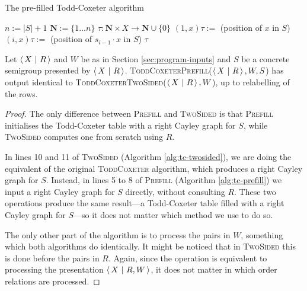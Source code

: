 \begin{algorithm}
\caption{The pre-filled Todd-Coxeter algorithm}
\label{alg:tc-prefill}
\begin{algorithmic}[1]
\State $n := |S| + 1$
\State $\mathbf{N} := \{1 \ldots n\}$
\State $\tau : \mathbf{N} \times X \to \mathbf{N} \cup \{0\}$
  \State $(1, x)\tau :=$ (position of $x$ in $S$)
    \State $(i, x)\tau :=$ (position of $s_{i-1} \cdot x$ in $S$)
  \EndFor
\EndFor
{}
    \State {}
  \EndFor
\EndFor
\State \Return $\tau$
\EndProcedure
\end{algorithmic}
\end{algorithm}

\begin{theorem}
  Let $\left\langle\,X ~\middle|~ R\,\right\rangle$ and $W$ be as in Section \ref{sec:program-inputs} and $S$ be a
  concrete semigroup presented by $\left\langle\,X ~\middle|~ R\,\right\rangle$.
  \textsc{ToddCoxeterPrefill}($\left\langle\,X ~\middle|~ R\,\right\rangle, W, S$) has output identical to
  \textsc{ToddCoxeterTwoSided}($\left\langle\,X ~\middle|~ R\,\right\rangle, W$), up to relabelling of the rows.
  \begin{proof}
    The only difference between \textsc{Prefill} and \textsc{TwoSided} is that
    \textsc{Prefill} initialises the Todd-Coxeter table with a right Cayley
    graph for $S$, while \textsc{TwoSided} computes one from scratch using $R$.


    In lines 10 and 11 of \textsc{TwoSided} (Algorithm \ref{alg:tc-twosided}),
    we are doing the equivalent of the original \textsc{ToddCoxeter} algorithm,
    which produces a right Cayley graph for $S$.  Instead, in lines 5 to 8 of
    \textsc{Prefill} (Algorithm \ref{alg:tc-prefill}) we input a right Cayley
    graph for $S$ directly, without consulting $R$.  These two operations
    produce the same result---a Todd-Coxeter table filled with a right Cayley
    graph for $S$---so it does not matter which method we use to do so.

    The only other part of the algorithm is to process the pairs in $W$,
    something which both algorithms do identically.  It might be noticed that in
    \textsc{TwoSided} this is done before the pairs in $R$.  Again, since the
    operation is equivalent to processing the presentation $\left\langle\,X ~\middle|~ R,W\,\right\rangle$, it
    does not matter in which order relations are processed.
  \end{proof}
\end{theorem}

